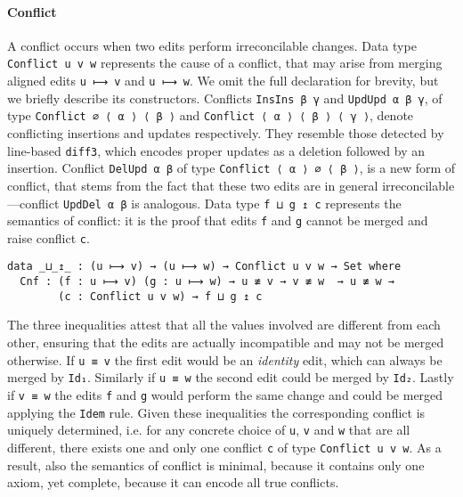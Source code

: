 \documentclass{sigplanconf}
\theoremstyle{plain}
\begin{document}
\paragraph{Conflict}
A conflict occurs when two edits perform irreconcilable changes.  
%
Data type \texttt{Conflict u v w} represents the cause of
a conflict, that may arise from merging aligned edits \texttt{u ⟼ v}
and \texttt{u ⟼ w}.
%
We omit the full declaration for brevity, but we briefly describe its
constructors.
%
Conflicts \texttt{InsIns β γ} and \texttt{UpdUpd α β γ}, of type
\texttt{Conflict ∅ ⟨ α ⟩ ⟨ β ⟩} and \texttt{Conflict ⟨ α ⟩ ⟨ β ⟩ ⟨ γ
  ⟩}, denote conflicting insertions and updates respectively.
%
They resemble those detected by line-based \texttt{diff3}, which
encodes proper updates as a deletion followed by an insertion.
%
Conflict \texttt{DelUpd α β} of type \texttt{Conflict ⟨ α ⟩ ∅ ⟨ β ⟩},
is a new form of conflict, that stems from the fact that these two
edits are in general irreconcilable ---conflict \texttt{UpdDel α β} is analogous.
%
Data type \texttt{f ⊔ g ↥ c} represents the semantics of conflict: it
is the proof that edits \texttt{f} and \texttt{g} cannot be merged and
raise conflict \texttt{c}.
\begin{verbatim}
data _⊔_↥_ : (u ⟼ v) → (u ⟼ w) → Conflict u v w → Set where
  Cnf : (f : u ⟼ v) (g : u ⟼ w) → u ≢ v → v ≢ w  → u ≢ w → 
        (c : Conflict u v w) → f ⊔ g ↥ c
\end{verbatim}
The three inequalities attest that all the values involved are
different from each other, ensuring that the edits are actually
incompatible and may not be merged otherwise. 
%
If \texttt{u ≡ v} the first edit would be an \emph{identity} edit,
which can always be merged by \texttt{Id₁}. Similarly if \texttt{u ≡
  w} the second edit could be merged by \texttt{Id₂}. Lastly if
\texttt{v ≡ w} the edits \texttt{f} and \texttt{g} would perform the
same change and could be merged applying the \texttt{Idem} rule.
%
Given these inequalities the corresponding conflict is uniquely
determined, i.e. for any concrete choice of \texttt{u}, \texttt{v} and
\texttt{w} that are all different, there exists one and only one
conflict \texttt{c} of type \texttt{Conflict u v w}.
%
As a result, also the semantics of conflict is minimal, because it
contains only one axiom, yet complete, because it can encode all true
conflicts.
\end{document}
